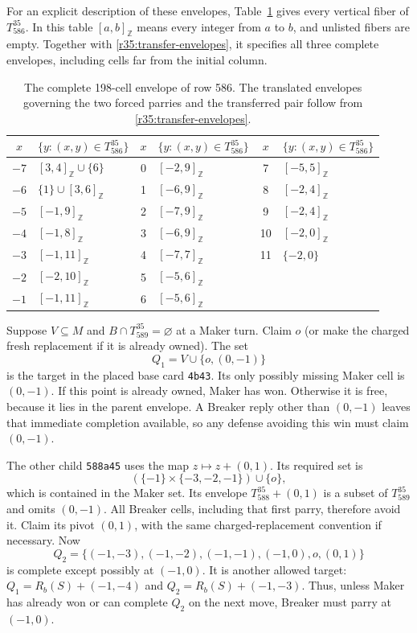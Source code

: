 For an explicit description of these envelopes, Table~\ref{r35:fibers}
gives every vertical fiber of \(T_{586}^{35}\).  In this table
\([a,b]_{\mathbb Z}\) means every integer from \(a\) to \(b\), and
unlisted fibers are empty.  Together with
\eqref{r35:transfer-envelopes}, it specifies all three complete
envelopes, including cells far from the initial column.
\begin{table}[tb]
\centering\small
\begin{tabular}{c|l@{\qquad}c|l@{\qquad}c|l}
\(x\)&\(\{y:(x,y)\in T_{586}^{35}\}\)&
\(x\)&\(\{y:(x,y)\in T_{586}^{35}\}\)&
\(x\)&\(\{y:(x,y)\in T_{586}^{35}\}\)\\ \hline
\(-7\)&\([3,4]_{\mathbb Z}\cup\{6\}\)&0&\([-2,9]_{\mathbb Z}\)&7&\([-5,5]_{\mathbb Z}\)\\
\(-6\)&\(\{1\}\cup[3,6]_{\mathbb Z}\)&1&\([-6,9]_{\mathbb Z}\)&8&\([-2,4]_{\mathbb Z}\)\\
\(-5\)&\([-1,9]_{\mathbb Z}\)&2&\([-7,9]_{\mathbb Z}\)&9&\([-2,4]_{\mathbb Z}\)\\
\(-4\)&\([-1,8]_{\mathbb Z}\)&3&\([-6,9]_{\mathbb Z}\)&10&\([-2,0]_{\mathbb Z}\)\\
\(-3\)&\([-1,11]_{\mathbb Z}\)&4&\([-7,7]_{\mathbb Z}\)&11&\(\{-2,0\}\)\\
\(-2\)&\([-2,10]_{\mathbb Z}\)&5&\([-5,6]_{\mathbb Z}\)&&\\
\(-1\)&\([-1,11]_{\mathbb Z}\)&6&\([-5,6]_{\mathbb Z}\)&&
\end{tabular}
\caption{The complete 198-cell envelope of row 586.  The translated
envelopes governing the two forced parries and the transferred pair
follow from \eqref{r35:transfer-envelopes}.}
\label{r35:fibers}
\end{table}

Suppose \(V\subseteq M\) and \(B\cap T_{589}^{35}=\varnothing\) at a
Maker turn.  Claim \(o\) (or make the charged fresh replacement if it
is already owned).  The set
\[
 Q_1=V\cup\{o,(0,-1)\}
\]
is the target in the placed base card \texttt{4b43}.  Its only possibly
missing Maker cell is \((0,-1)\).  If this point is already owned,
Maker has won.  Otherwise it is free, because it lies in the parent
envelope.  A Breaker reply other than \((0,-1)\) leaves that immediate
completion available, so any defense avoiding this win must claim
\((0,-1)\).

The other child \texttt{588a45} uses the map \(z\mapsto z+(0,1)\).
Its required set is
\[
 (\{-1\}\times\{-3,-2,-1\})\cup\{o\},
\]
which is contained in the Maker set.  Its envelope
\(T_{588}^{35}+(0,1)\) is a subset of \(T_{589}^{35}\) and omits
\((0,-1)\).  All Breaker cells, including that first parry, therefore
avoid it.  Claim its pivot \((0,1)\), with the same charged-replacement
convention if necessary.  Now
\[
 Q_2=\{(-1,-3),(-1,-2),(-1,-1),(-1,0),o,(0,1)\}
\]
is complete except possibly at \((-1,0)\).  It is another allowed
target: \(Q_1=R_b(S)+(-1,-4)\) and
\(Q_2=R_b(S)+(-1,-3)\).  Thus, unless Maker has already won or can
complete \(Q_2\) on the next move, Breaker must parry at \((-1,0)\).

